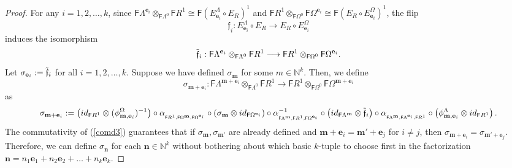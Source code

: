 \documentclass[12pt]{amsart}
\newcommand{\N}{\mathbf{n}}
\newcommand{\M}{\mathbf{m}}
\theoremstyle{definition}
\theoremstyle{remark}
\begin{document}
\begin{proof}
For any $i=1,2,\ldots,k$, since $\mathsf{F}\Lambda^{\mathbf{e}_i}\otimes_{\mathsf{F}\Lambda^0}\mathsf{F}R^1\cong \mathsf{F}(E_{\mathbf{e}_i}^\Lambda \circ E_R)^1$ and $\mathsf{F}R^1\otimes_{\mathsf{F}\Omega^0}\mathsf{F}\Omega^{\mathbf{e}_i}\cong \mathsf{F}(E_R\circ E_{\mathbf{e}_i}^\Omega)^1$, the flip 
\[\mathfrak{f}_i:E_{\mathbf{e}_i}^\Lambda\circ E_R\longrightarrow E_R\circ E_{\mathbf{e}_i}^\Omega\] induces the isomorphism
\[\Tilde{\mathfrak{f}}_i:\mathsf{F}\Lambda^{\mathbf{e}_i}\otimes_{\mathsf{F}\Lambda^0}\mathsf{F}R^1\longrightarrow \mathsf{F}R^1\otimes_{\mathsf{F}\Omega^0}\mathsf{F}\Omega^{\mathbf{e}_i}.\] Let $\sigma_{\mathbf{e}_i}:=\Tilde{\mathfrak{f}}_i$ for all $i=1,2,\ldots,k$. Suppose we have defined $\sigma_\M$ for some $m\in \mathbb{N}^k$. Then, we define \[\sigma_{\M+\mathbf{e}_i}:\mathsf{F}\Lambda^{\M+\mathbf{e}_i}\otimes_{\mathsf{F}\Lambda^0}\mathsf{F}R^1\longrightarrow \mathsf{F}R^1\otimes_{\mathsf{F}\Omega^0}\mathsf{F}\Omega^{\M+\mathbf{e}_i}\] as \[\sigma_{\M+\mathbf{e}_i}:=\left(id_{\mathsf{F}R^1}\otimes (\phi_{\M,\mathbf{e}_i}^\Omega)^{-1}\right) \circ \alpha_{_{\mathsf{F}R^1,\mathsf{F}\Omega^\M,\mathsf{F}\Omega^{\mathbf{e}_i}}}\circ \left(\sigma_\M\otimes id_{\mathsf{F}\Omega^{\mathbf{e}_i}}\right)\circ \alpha_{_{\mathsf{F}\Lambda^\M,\mathsf{F}R^1,\mathsf{F}\Omega^{\mathbf{e}_i}}}^{-1}\circ \left(id_{\mathsf{F}\Lambda^\M}\otimes \Tilde{\mathfrak{f}}_i\right)\circ \alpha_{_{\mathsf{F}\Lambda^\M,\mathsf{F}\Lambda^{\mathbf{e}_i},\mathsf{F}R^1}}\circ \left(\phi_{\M,\mathbf{e}_i}^\Lambda\otimes id_{\mathsf{F}R^1}\right).\] The commutativity of (\ref{comd3}) guarantees that if $\sigma_\M,\sigma_{\M'}$ are already defined and $\M+\mathbf{e}_i=\M'+\mathbf{e}_j$ for $i\neq j$, then $\sigma_{\M+\mathbf{e}_i}=\sigma_{\M'+\mathbf{e}_j}$. Therefore, we can define $\sigma_\N$ for each $\N\in \mathbb{N}^k$ without bothering about which basic $k$-tuple to choose first in the factorization $\N=n_1 \mathbf{e}_1+n_2 \mathbf{e}_2+\dots +n_k \mathbf{e}_k$. 


\end{proof}
\end{document}
